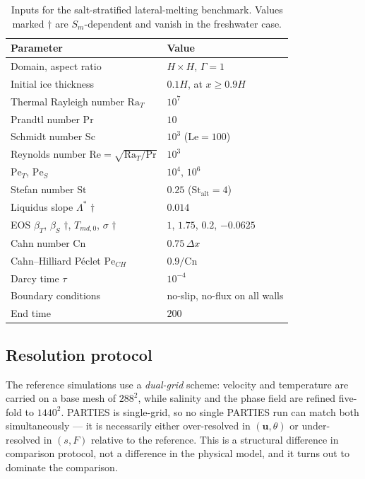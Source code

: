 \documentclass[review,12pt]{elsarticle}
\newcommand{\uvec}{\mathbf{u}}
\newcommand{\Pet}{\mathrm{Pe}_T}
\newcommand{\Pes}{\mathrm{Pe}_S}
\newcommand{\Pech}{\mathrm{Pe}_{CH}}
\newcommand{\Ra}{\mathrm{Ra}}
\newcommand{\St}{\mathrm{St}}
\begin{document}
\begin{table}[H]
\centering
\caption{Inputs for the salt-stratified lateral-melting benchmark. Values marked
$\dagger$ are $S_m$-dependent and vanish in the freshwater case.}
\label{tab:yang-inputs}
\begin{tabular}{l l}
\toprule
Parameter & Value \\
\midrule
Domain, aspect ratio & $H\times H$, $\Gamma = 1$ \\
Initial ice thickness & $0.1H$, at $x\ge 0.9H$ \\
Thermal Rayleigh number $\Ra_T$ & $10^{7}$ \\
Prandtl number $\mathrm{Pr}$ & $10$ \\
Schmidt number $\mathrm{Sc}$ & $10^3$ ($\mathrm{Le}=100$) \\
Reynolds number $\mathrm{Re} = \sqrt{\Ra_T/\mathrm{Pr}}$ & $10^{3}$ \\
$\Pet$, $\Pes$ & $10^{4}$, $10^{6}$ \\
Stefan number $\St$ & $0.25$ ($\St_{\mathrm{alt}}=4$) \\
Liquidus slope $\Lambda^{*}$ $\dagger$ & $0.014$ \\
EOS $\beta_T$, $\beta_S$ $\dagger$, $T_{md,0}$, $\sigma$ $\dagger$
  & $1$, $1.75$, $0.2$, $-0.0625$ \\
Cahn number $\mathrm{Cn}$ & $0.75\,\Delta x$ \\
Cahn--Hilliard P\'eclet $\Pech$ & $0.9/\mathrm{Cn}$ \\
Darcy time $\tau$ & $10^{-4}$ \\
Boundary conditions & no-slip, no-flux on all walls \\
End time & $200$ \\
\bottomrule
\end{tabular}
\end{table}

\subsection{Resolution protocol}
\label{sec:protocol}

The reference simulations use a \emph{dual-grid} scheme: velocity and
temperature are carried on a base mesh of $288^2$, while salinity and the phase
field are refined five-fold to $1440^2$. PARTIES is single-grid, so no single
PARTIES run can match both simultaneously --- it is necessarily either
over-resolved in $(\uvec,\theta)$ or under-resolved in $(s,F)$ relative to the
reference. This is a structural difference in comparison protocol, not a
difference in the physical model, and it turns out to dominate the comparison.
\end{document}
